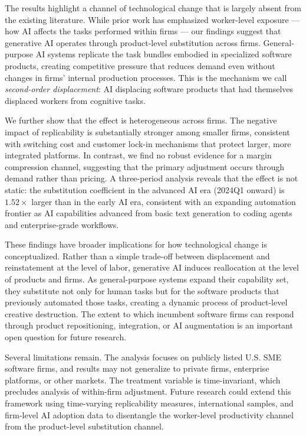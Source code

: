 \documentclass[12pt,a4paper]{article}
\begin{document}
The results highlight a channel of technological change that is largely absent from the existing literature. While prior work has emphasized worker-level exposure --- how AI affects the tasks performed within firms --- our findings suggest that generative AI operates through product-level substitution across firms. General-purpose AI systems replicate the task bundles embodied in specialized software products, creating competitive pressure that reduces demand even without changes in firms' internal production processes. This is the mechanism we call \emph{second-order displacement}: AI displacing software products that had themselves displaced workers from cognitive tasks.

We further show that the effect is heterogeneous across firms. The negative impact of replicability is substantially stronger among smaller firms, consistent with switching cost and customer lock-in mechanisms that protect larger, more integrated platforms. In contrast, we find no robust evidence for a margin compression channel, suggesting that the primary adjustment occurs through demand rather than pricing. A three-period analysis reveals that the effect is not static: the substitution coefficient in the advanced AI era (2024Q1 onward) is $1.52\times$ larger than in the early AI era, consistent with an expanding automation frontier as AI capabilities advanced from basic text generation to coding agents and enterprise-grade workflows.

These findings have broader implications for how technological change is conceptualized. Rather than a simple trade-off between displacement and reinstatement at the level of labor, generative AI induces reallocation at the level of products and firms. As general-purpose systems expand their capability set, they substitute not only for human tasks but for the software products that previously automated those tasks, creating a dynamic process of product-level creative destruction. The extent to which incumbent software firms can respond through product repositioning, integration, or AI augmentation is an important open question for future research.

Several limitations remain. The analysis focuses on publicly listed U.S. SME software firms, and results may not generalize to private firms, enterprise platforms, or other markets. The treatment variable is time-invariant, which precludes analysis of within-firm adjustment. Future research could extend this framework using time-varying replicability measures, international samples, and firm-level AI adoption data to disentangle the worker-level productivity channel from the product-level substitution channel.
\end{document}
